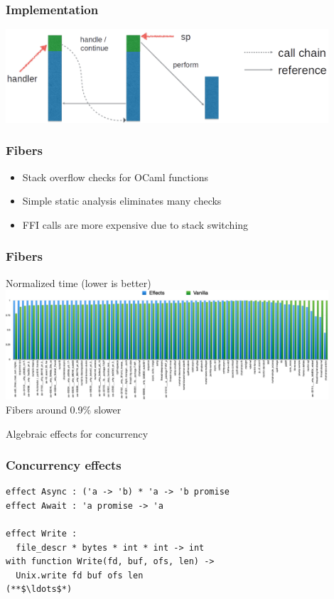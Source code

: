 \documentclass{beamer}
\begin{document}
\begin{frame}[fragile]
\frametitle{Implementation}
\begin{center}
\includegraphics[width = 0.9\textwidth]{./imp3}
\end{center}
\end{frame}

\begin{frame}
\frametitle{Fibers}
\begin{itemize}
\setlength\itemsep{2em}
\item Stack overflow checks for OCaml functions
\item Simple static analysis eliminates many checks
\item FFI calls are more expensive due to stack switching
\end{itemize}
\end{frame}

\begin{frame}[fragile]
\frametitle{Fibers}
\begin{center}
Normalized time (lower is better) \\[2em]
\includegraphics[width = 0.9\textwidth]{./fibers} \\[2em]
Fibers around 0.9\% slower
\end{center}
\end{frame}

\begin{frame}[c]
\begin{center}
\Huge Algebraic effects for concurrency
\end{center}
\end{frame}

\begin{frame}[fragile]
\frametitle{Concurrency effects}
\begin{lstlisting}[style=ocaml]
effect Async : ('a -> 'b) * 'a -> 'b promise
effect Await : 'a promise -> 'a

effect Write :
  file_descr * bytes * int * int -> int
with function Write(fd, buf, ofs, len) ->
  Unix.write fd buf ofs len
(**$\ldots$*)
\end{lstlisting}
\end{frame}
\end{document}
